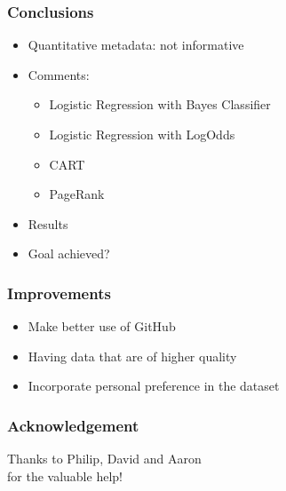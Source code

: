 \documentclass[fleqn]{beamer}
\begin{document}
\begin{frame}
\frametitle{Conclusions}
    \begin{itemize}
        \item Quantitative metadata: not informative
        \item Comments: 
        	\begin{itemize}
	   \item Logistic Regression with Bayes Classifier
	   \item Logistic Regression with LogOdds
	   \item CART
	   \item PageRank
	\end{itemize}
       \item Results
       \item Goal achieved?
    \end{itemize}

\end{frame}

\begin{frame}
\frametitle{Improvements}
   \begin{itemize}
      \item Make better use of GitHub
      \item Having data that are of higher quality
      \item Incorporate personal preference in the dataset 
   \end{itemize}
\end{frame}

\begin{frame}
\frametitle{Acknowledgement}
\begin{center}
Thanks to Philip, David and Aaron\\
for the valuable help!
\end{center}
   
\end{frame}
\end{document}
